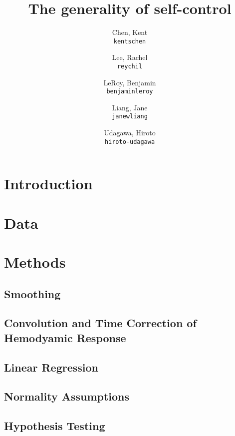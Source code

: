 \documentclass[11pt]{article}
\title{The generality of self-control}
\author{
  Chen, Kent\\
  \texttt{kentschen}
  \and
  Lee, Rachel\\
  \texttt{reychil}
  \and
  LeRoy, Benjamin\\
  \texttt{benjaminleroy}
  \and
  Liang, Jane\\
  \texttt{janewliang}
  \and
  Udagawa, Hiroto\\
  \texttt{hiroto-udagawa}
}
\begin{document}
\maketitle

\abstract{}

\section{Introduction} \label{introduction}
	

\section{Data} \label{data}

	
	
\section{Methods} \label{methods}
	\subsection{Smoothing}
	
		

	\subsection{Convolution and Time Correction of Hemodyamic Response}

		
		
	\subsection{Linear Regression}
	
		

	\subsection{Normality Assumptions}
	
		
		
	\subsection{Hypothesis Testing} \label{hypothesis_testing}
	
\end{document}
